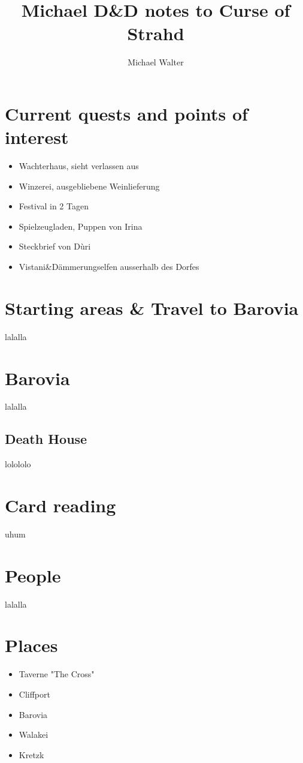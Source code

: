 \documentclass{article}
\begin{document}
\title{Michael D\&D notes to Curse of Strahd}
\author{Michael Walter}
\maketitle
\section{Current quests and points of interest}
\begin{itemize}
	\item Wachterhaus, sieht verlassen aus
	\item Winzerei, ausgebliebene Weinlieferung
	\item Festival in 2 Tagen
	\item Spielzeugladen, Puppen von Irina
	\item Steckbrief von Dùri
	\item Vistani\&Dämmerungselfen ausserhalb des Dorfes
\end{itemize}
\section{Starting areas \& Travel to Barovia}
lalalla
\section{Barovia}
lalalla
\subsection{Death House}
lolololo
\section{Card reading}
uhum
\section{People}
lalalla
\section{Places}
\begin{itemize}
	\item Taverne "The Cross"
	\item Cliffport
	\item Barovia
	\item Walakei
	\item Kretzk
\end{itemize}
\end{document}
